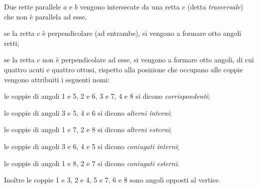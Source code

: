 Due rette parallele \(a\) e \(b\) vengono intersecate da una retta \(c\) 
(detta \emph{trasversale}) che non è parallela ad esse,
\begin{itemize*}
  \item se la retta \(c\) è perpendicolare (ad entrambe), si vengono a 
  formare otto angoli retti; 
  \item se la retta \(c\) non è perpendicolare ad esse, si vengono a 
  formare otto angoli, di cui quattro acuti e quattro ottusi, rispetto 
  alla posizione che occupano alle coppie vengono attribuiti i seguenti 
  nomi: %
  \begin{itemize*}
    \item le coppie di angoli 1 e 5, 2 e 6, 3 e 7, 4 e 8 si dicono 
    \emph{corrispondenti};
    \item le coppie di angoli 3 e 5, 4 e 6 si dicono \emph{alterni 
      interni};
    \item le coppie di angoli 1 e 7, 2 e 8 si dicono \emph{alterni 
      esterni};
    \item le coppie di angoli 3 e 6, 4 e 5 si dicono \emph{coniugati 
      interni};
    \item le coppie di angoli 1 e 8, 2 e 7 si dicono \emph{coniugati 
      esterni}.
  \end{itemize*}
\end{itemize*}
Inoltre le coppie 1 e 3, 2 e 4, 5 e 7, 6 e 8 sono angoli opposti al 
vertice.


